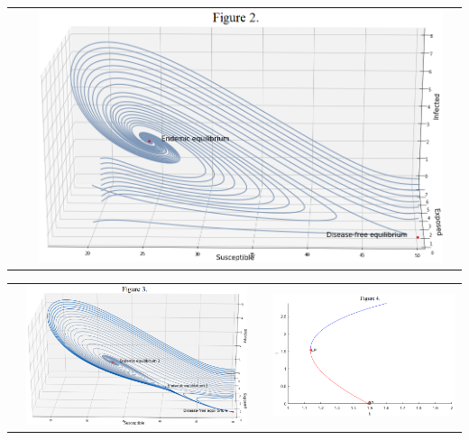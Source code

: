 \documentclass[portrait,final,a0paper]{baposter}
\begin{document}
\begin{poster}
{\begin{center}
\begin{tabular}{llll}
&
\hspace{3 em}
&
\includegraphics[scale = 0.31]{Endemic_and_Disease_free.png}
\end{tabular}

\begin{tabular}{llll}
\hspace{0.5 em}
&
\includegraphics[scale = 0.3]{Two_Endemic.png}
&
\hspace{3 em}
&
\includegraphics[scale = 0.29]{Bifurcation_b.png}
\end{tabular}
\end{center}
  }
  

\end{poster}
\end{document}
